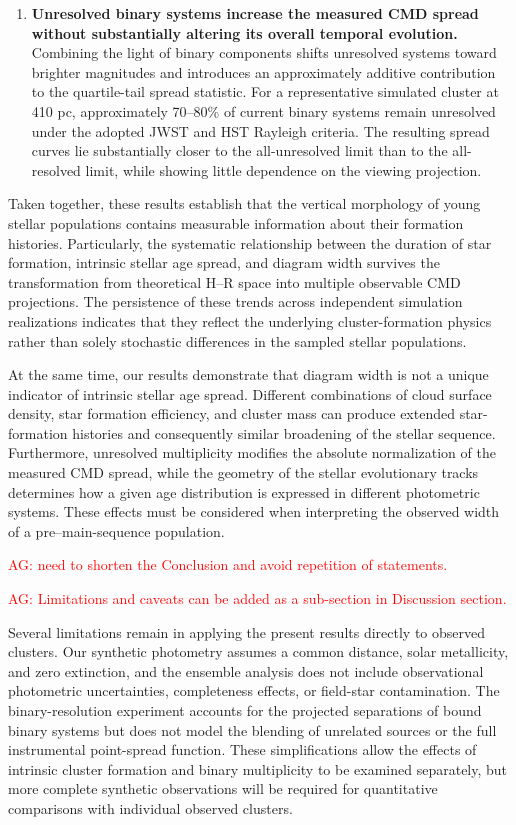 \documentclass[linenumbers, twocolumn]{aastex631}
\begin{document}
\begin{enumerate}
    \item \textbf{Unresolved binary systems increase the measured CMD spread without substantially altering its overall temporal evolution.} Combining the light of binary components shifts unresolved systems toward brighter magnitudes and introduces an approximately additive contribution to the quartile-tail spread statistic. For a representative simulated cluster at 410 pc, approximately 70--80\% of current binary systems remain unresolved under the adopted JWST and HST Rayleigh criteria. The resulting spread curves lie substantially closer to the all-unresolved limit than to the all-resolved limit, while showing little dependence on the viewing projection.

\end{enumerate}

Taken together, these results establish that the vertical morphology of young stellar populations contains measurable information about their formation histories. Particularly, the systematic relationship between the duration of star formation, intrinsic stellar age spread, and diagram width survives the transformation from theoretical H--R space into multiple observable CMD projections. The persistence of these trends across independent simulation realizations indicates that they reflect the underlying cluster-formation physics rather than solely stochastic differences in the sampled stellar populations.

At the same time, our results demonstrate that diagram width is not a unique indicator of intrinsic stellar age spread. Different combinations of cloud surface density, star formation efficiency, and cluster mass can produce extended star-formation histories and consequently similar broadening of the stellar sequence. Furthermore, unresolved multiplicity modifies the absolute normalization of the measured CMD spread, while the geometry of the stellar evolutionary tracks determines how a given age distribution is expressed in different photometric systems. These effects must be considered when interpreting the observed width of a pre--main-sequence population.

\textcolor{red}{AG: need to shorten the Conclusion and avoid repetition of statements.}

\textcolor{red}{AG: Limitations and caveats can be added as a sub-section in Discussion section.}

Several limitations remain in applying the present results directly to observed clusters. Our synthetic photometry assumes a common distance, solar metallicity, and zero extinction, and the ensemble analysis does not include observational photometric uncertainties, completeness effects, or field-star contamination. The binary-resolution experiment accounts for the projected separations of bound binary systems but does not model the blending of unrelated sources or the full instrumental point-spread function. These simplifications allow the effects of intrinsic cluster formation and binary multiplicity to be examined separately, but more complete synthetic observations will be required for quantitative comparisons with individual observed clusters.
\end{document}
